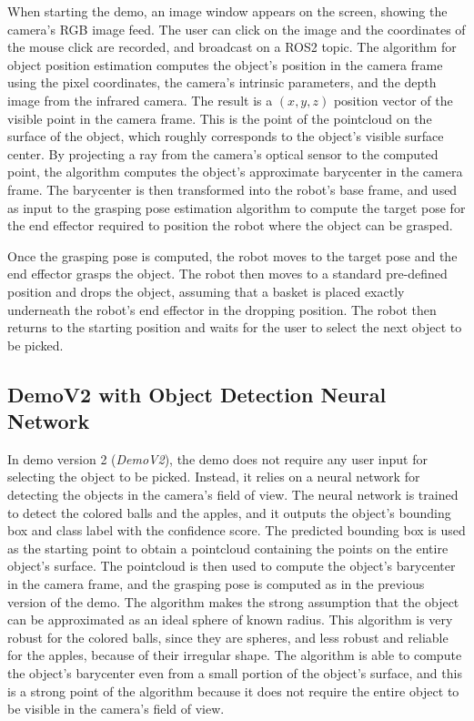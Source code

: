 When starting the demo, an image window appears on the screen, showing the camera's RGB image feed.
The user can click on the image and the coordinates of the mouse click are recorded, and broadcast on a ROS2
topic. The algorithm for object position estimation computes the object's position in the camera frame
using the pixel coordinates, the camera's intrinsic parameters, and the depth image from the infrared camera.
The result is a $(x, y, z)$ position vector of the visible point in the camera frame. 
This is the point of the pointcloud on the surface of the object, which roughly corresponds to the 
object's visible surface center. By projecting a ray from the camera's optical sensor to the computed point,
the algorithm computes the object's approximate barycenter in the camera frame. The barycenter is then transformed
into the robot's base frame, and used as input to the grasping pose estimation algorithm to compute the target pose
for the end effector required to position the robot where the object can be grasped.

Once the grasping pose is computed, the robot moves to the target pose and the end effector grasps the object.
The robot then moves to a standard pre-defined position and drops the object, assuming that a basket
is placed exactly underneath the robot's end effector in the dropping position. The robot then returns to the
starting position and waits for the user to select the next object to be picked.

\subsection{DemoV2 with Object Detection Neural Network}

In demo version 2 (\textit{DemoV2}), the demo does not require any user input for selecting the object to be picked.
Instead, it relies on a neural network for detecting the objects in the camera's field of view. The neural network
is trained to detect the colored balls and the apples, and it outputs the object's bounding box and class label
with the confidence score. The predicted bounding box is used as the starting point to obtain a pointcloud
containing the points on the entire object's surface. The pointcloud is then used to compute the object's barycenter
in the camera frame, and the grasping pose is computed as in the previous version of the demo.
The algorithm makes the strong assumption that the object can be approximated as an ideal sphere of known radius.
This algorithm is very robust for the colored balls, since they are spheres, and less robust and reliable
for the apples, because of their irregular shape. The algorithm is able to compute the object's barycenter
even from a small portion of the object's surface, and this is a strong point of the algorithm because
it does not require the entire object to be visible in the camera's field of view.

